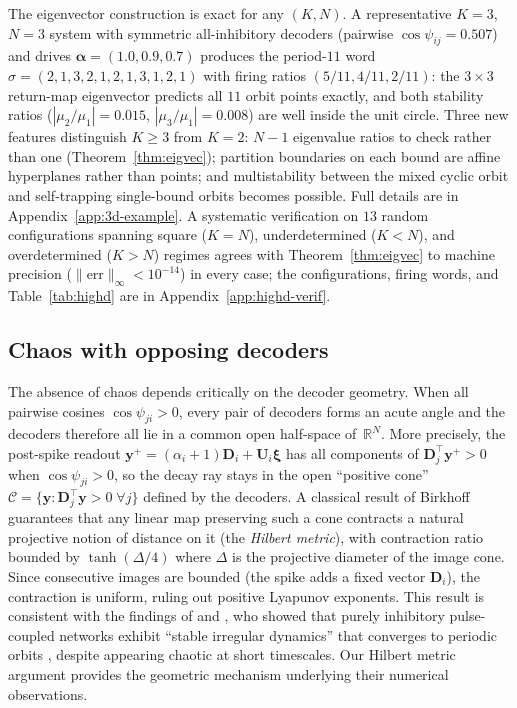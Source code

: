\documentclass[12pt]{article}
\newcommand{\vv}[1]{\mathbf{#1}}
\newcommand{\DD}{\vv{D}}
\newcommand{\yy}{\vv{y}}
\newcommand{\xxi}{\boldsymbol{\xi}}
\newcommand{\RR}{\mathbb{R}}
\begin{document}
The eigenvector construction is exact for any $(K,N)$. A representative $K=3$, $N=3$ system with symmetric all-inhibitory decoders (pairwise $\cos\psi_{ij}=0.507$) and drives $\boldsymbol{\alpha}=(1.0,0.9,0.7)$ produces the period-$11$ word $\sigma=(2,1,3,2,1,2,1,3,1,2,1)$ with firing ratios $(5/11,4/11,2/11)$: the $3\times 3$ return-map eigenvector predicts all $11$ orbit points exactly, and both stability ratios ($|\mu_2/\mu_1|=0.015$, $|\mu_3/\mu_1|=0.008$) are well inside the unit circle. Three new features distinguish $K\geq 3$ from $K=2$: $N-1$ eigenvalue ratios to check rather than one (Theorem~\ref{thm:eigvec}); partition boundaries on each bound are affine hyperplanes rather than points; and multistability between the mixed cyclic orbit and self-trapping single-bound orbits becomes possible. Full details are in Appendix~\ref{app:3d-example}. A systematic verification on $13$ random configurations spanning square ($K=N$), underdetermined ($K<N$), and overdetermined ($K>N$) regimes agrees with Theorem~\ref{thm:eigvec} to machine precision ($\|\text{err}\|_\infty<10^{-14}$) in every case; the configurations, firing words, and Table~\ref{tab:highd} are in Appendix~\ref{app:highd-verif}.

\subsection{Chaos with opposing decoders}\label{sec:chaos}

The absence of chaos depends critically on the decoder geometry. When all pairwise cosines $\cos\psi_{ji}>0$, every pair of decoders forms an acute angle and the decoders therefore all lie in a common open half-space of~$\RR^N$. More precisely, the post-spike readout $\yy^+=(\alpha_i+1)\DD_i+\vv{U}_i\xxi$ has all components of $\DD_j^\top\yy^+>0$ when $\cos\psi_{ji}>0$, so the decay ray stays in the open ``positive cone'' $\mathcal{C}=\{\yy:\DD_j^\top\yy>0\;\forall j\}$ defined by the decoders. A classical result of Birkhoff guarantees that any linear map preserving such a cone contracts a natural projective notion of distance on it (the \emph{Hilbert metric}), with contraction ratio bounded by $\tanh(\Delta/4)$ where $\Delta$ is the projective diameter of the image cone. Since consecutive images are bounded (the spike adds a fixed vector $\DD_i$), the contraction is uniform, ruling out positive Lyapunov exponents. This result is consistent with the findings of \citet{jahnke2008stable} and \citet{jahnke2009chaotic}, who showed that purely inhibitory pulse-coupled networks exhibit ``stable irregular dynamics'' that converges to periodic orbits \citep[see also][]{jin2002fast}, despite appearing chaotic at short timescales. Our Hilbert metric argument provides the geometric mechanism underlying their numerical observations.
\end{document}
